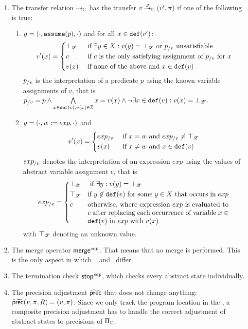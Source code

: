 \begin{enumerate}[leftmargin=*, label=\arabic*.]
\item
The transfer relation $\rightsquigarrow_{\mathbb{C}}$ has the transfer $v \overset{g}{\rightsquigarrow}_{\mathbb{C}} (v', \pi)$ if one of the following is true:
	\begin{enumerate}[label=\alph*)]
	\item $g = (\cdot, \texttt{assume}(p), \cdot)$ and for all $x \in \texttt{def}(v')$:
		\[ v'(x) = \begin{dcases}
			\bot_{\mathscr{Z}} & \text{ if } \exists y \in X : v(y) = \bot_{\mathscr{Z}} \text{ or } p_{/v} \text{ unsatisfiable}\\
			c & \text{ if $c$ is the only satisfying assignment of $p_{/v}$ for $x$}\\
			v(x) & \text{ if none of the above and } x \in \texttt{def}(v)
		\end{dcases}\]
		$p_{/v}$ is the interpretation of a predicate $p$ using the known variable assignments of $v$, that is
		$p_{/v} = p \wedge \bigwedge\limits_{x \in \texttt{def}(v), v(x) \in \mathbb{Z}}  x = v(x) \wedge \neg \exists x \in \texttt{def}(v) : v(x) = \bot_{\mathscr{Z}}$.
	\item $g = (\cdot, w := exp, \cdot)$ and
		\[ v'(x) = \begin{dcases}
			exp_{/v} & \text{ if } x = w \text{ and } exp_{/v} \neq \top_{\mathscr{Z}}\\
			v(x) & \text{ if } x \neq w \text{ and } x \in \texttt{def}(v)\\
		\end{dcases}\]
		$exp_{/v}$ denotes the interpretation of an expression $exp$ using the values of abstract variable assignment $v$, that is
		\[exp_\using{v} = \begin{dcases}
			\bot_\valueset & \text{ if } \exists y : v(y) = \bot_\valueset\\
			\top_\valueset  & \parbox[t]{.6\textwidth}{if $y \not\in \defRange(v)$ for some $y \in X$ that occurs in $exp$}\\
			c & \parbox[t]{.6\textwidth}{ otherwise, where expression $exp$ is evaluated to $c$ after replacing each occurrence of variable $x \in \defRange(v)$ in $exp$ with $v(x)$}
		\end{dcases}\]
		with $\top_{\mathscr{Z}}$ denoting an unknown value.
	\end{enumerate}

\item
The merge operator $\operatorname{\operatorname{\mathsf{merge}}}^{sep}$. That means that no merge is performed. This is the only aspect in which \constantpropagationCPA\ \cite{BeyerBook} and \ differ.

\item
The termination check $\operatorname{\operatorname{\mathsf{stop}}}^{sep}$, which checks every abstract state individually.

\item
The precision adjustment $\operatorname{\widetilde{\operatorname{\operatorname{\mathsf{prec}}}}}$ that does not change anything: $\operatorname{\widetilde{\operatorname{\operatorname{\mathsf{prec}}}}}(v, \pi, R) = (v, \pi)$.
Since we only track the program location in the \locationCPA, a composite precision adjustment has to handle the correct adjustment of abstract states to precisions of $\Pi_{\mathbb{C}}$.

\end{enumerate}

